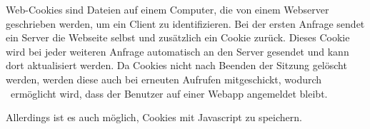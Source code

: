 
Web-Cookies sind Dateien auf einem Computer, die von einem Webserver geschrieben werden, um ein Client zu identifizieren. 
Bei der ersten Anfrage sendet ein Server die Webseite selbst und zusätzlich ein Cookie zurück. 
Dieses Cookie wird bei jeder weiteren Anfrage automatisch an den Server gesendet und kann dort aktualisiert werden. 
Da Cookies nicht nach Beenden der Sitzung gelöscht werden, werden diese auch bei erneuten Aufrufen mitgeschickt, wodurch \zb\ ermöglicht wird, dass der Benutzer auf einer Webapp angemeldet bleibt. 

Allerdings ist es auch möglich, Cookies mit Javascript zu speichern. %
\cite{wikiCookies}

